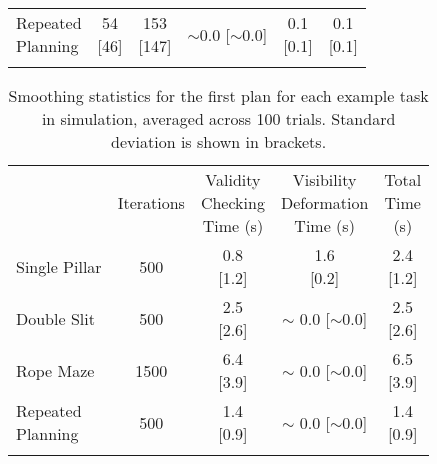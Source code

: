 \begin{table}[h]
\begin{tabular}{lccccc}
\noalign{\smallskip}
\makecell[l]{Repeated\\Planning} & \makecell{54   \\  {[46]}} & \makecell{153  \\ {[147]}} & \makecell{$\sim$0.0 \\{[$\sim$0.0]}} & \makecell{0.1 \\{[0.1]}} & \makecell{0.1 \\{[0.1]}}\\
\noalign{\smallskip}\hline
\end{tabular}
\end{table}

\begin{table}[h]
\centering
\caption{Smoothing statistics for the first plan for each example task in simulation, averaged across 100 trials. Standard deviation is shown in brackets.}
\label{tab:smoothing_statistics}
\begin{tabular}{lcccc}
\hline\noalign{\smallskip}
    & Iterations & \makecell{Validity\\Checking\\Time (s)} & \makecell{Visibility\\Deformation\\Time (s)}& \makecell{Total\\Time\\(s)}\\
\noalign{\smallskip}\hline\noalign{\smallskip}
Single Pillar                    &  500 & \makecell{0.8 \\{[1.2]}} & \makecell{       1.6 \\{[0.2]}}       & \makecell{2.4 \\{[1.2]}}\\
\noalign{\smallskip}
Double Slit                      &  500 & \makecell{2.5 \\{[2.6]}} & \makecell{$\sim$ 0.0 \\{[$\sim$0.0]}} & \makecell{2.5 \\{[2.6]}}\\
\noalign{\smallskip}
Rope Maze                        & 1500 & \makecell{6.4 \\{[3.9]}} & \makecell{$\sim$ 0.0 \\{[$\sim$0.0]}} & \makecell{6.5 \\{[3.9]}}\\
\noalign{\smallskip}
\makecell[l]{Repeated\\Planning} &  500 & \makecell{1.4 \\{[0.9]}} & \makecell{$\sim$ 0.0 \\{[$\sim$0.0]}} & \makecell{1.4 \\{[0.9]}}\\
\noalign{\smallskip}\hline
\end{tabular}
\end{table}

